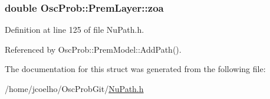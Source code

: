 \subsubsection[{\texorpdfstring{zoa}{zoa}}]{\setlength{\rightskip}{0pt plus 5cm}double Osc\+Prob\+::\+Prem\+Layer\+::zoa}\hypertarget{structOscProb_1_1PremLayer_a8687a8169d786fca79908292d11077f5}{}\label{structOscProb_1_1PremLayer_a8687a8169d786fca79908292d11077f5}


Definition at line 125 of file Nu\+Path.\+h.



Referenced by Osc\+Prob\+::\+Prem\+Model\+::\+Add\+Path().



The documentation for this struct was generated from the following file\+:\begin{DoxyCompactItemize}
\item 
/home/jcoelho/\+Osc\+Prob\+Git/\hyperlink{NuPath_8h}{Nu\+Path.\+h}\end{DoxyCompactItemize}

